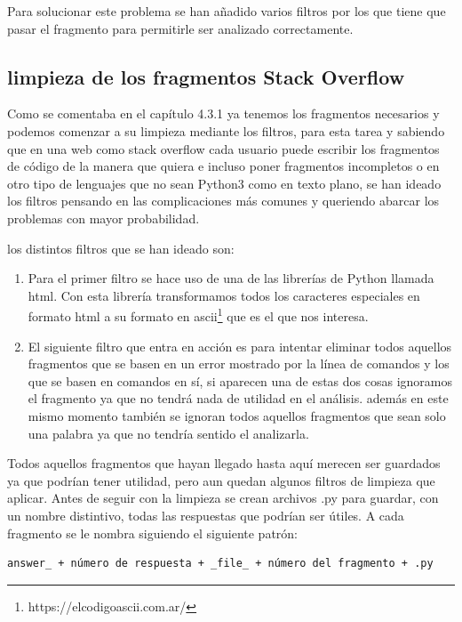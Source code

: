 \documentclass[a4paper, 12pt]{book}
\begin{document}
Para solucionar este problema se han añadido varios filtros por los que tiene que pasar el fragmento para permitirle ser analizado correctamente.

\subsection{limpieza de los fragmentos Stack Overflow}

Como se comentaba en el capítulo 4.3.1 ya tenemos los fragmentos necesarios y podemos comenzar a su limpieza mediante los filtros, para esta tarea y sabiendo que en una web como stack overflow cada usuario puede escribir los fragmentos de código de la manera que quiera e incluso poner fragmentos incompletos o en otro tipo de lenguajes que no sean Python3 como en texto plano, se han ideado los filtros pensando en las complicaciones más comunes y queriendo abarcar los problemas con mayor probabilidad.

los distintos filtros que se han ideado son:

\begin{enumerate}
	\item Para el primer filtro se hace uso de una de las librerías de Python llamada html\cite{website:libreriahtml}. Con esta librería transformamos todos los caracteres especiales en formato html a su formato en ascii\footnote{https://elcodigoascii.com.ar/} que es el que nos interesa.
	\item El siguiente filtro que entra en acción es para intentar eliminar todos aquellos fragmentos que se basen en un error mostrado por la línea de comandos y los que se basen en comandos en sí, si aparecen una de estas dos cosas ignoramos el fragmento ya que no tendrá nada de utilidad en el análisis. además en este mismo momento también se ignoran todos aquellos fragmentos que sean solo una palabra ya que no tendría sentido el analizarla.
\end{enumerate}

Todos aquellos fragmentos que hayan llegado hasta aquí merecen ser guardados ya que podrían tener utilidad, pero aun quedan algunos filtros de limpieza que aplicar. Antes de seguir con la limpieza se crean archivos .py para guardar, con un nombre distintivo, todas las respuestas que podrían ser útiles. A cada fragmento se le nombra siguiendo el siguiente patrón:

\begin{verbatim}
answer_ + número de respuesta + _file_ + número del fragmento + .py
\end{verbatim}
\end{document}
